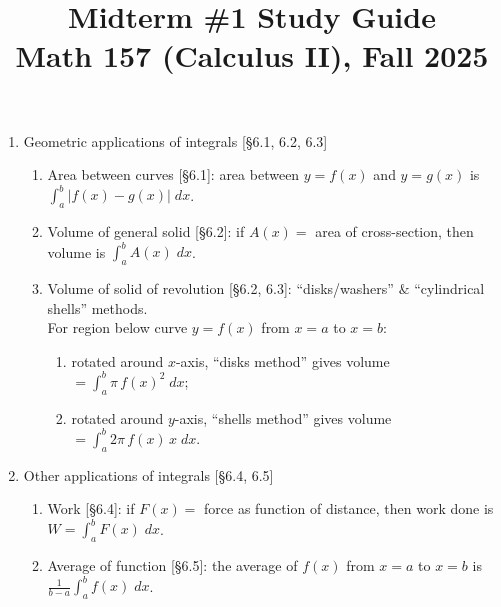 \documentclass[11pt]{article}
\title{Midterm \#1 Study Guide \\ Math 157 (Calculus II), Fall 2025}
\date{}
\begin{document}
\maketitle

\thispagestyle{empty}

\vspace{-2cm}

\begin{enumerate}
\item Geometric applications of integrals [\S6.1, 6.2, 6.3]
\begin{enumerate}
\item Area between curves [\S6.1]: area between $y=f(x)$ and $y=g(x)$ is $\int_{a}^{b} |f(x)-g(x)| \; dx$.
\item Volume of general solid [\S6.2]: if $A(x)=$ area of cross-section, then volume is $\int_a^b A(x) \;dx$.
\item Volume of solid of revolution [\S6.2, 6.3]: ``disks/washers'' $\&$ ``cylindrical shells'' methods.  \\For region below curve $y=f(x)$ from $x=a$ to $x=b$:
\begin{enumerate}
\item rotated around $x$-axis, ``disks method'' gives volume $=\int_a^b \pi \, f(x)^2 \; dx$;
\item rotated around $y$-axis, ``shells method'' gives volume $=\int_a^b 2 \pi \, f(x) \, x \; dx$.
\end{enumerate}
\end{enumerate}

\item Other applications of integrals [\S6.4, 6.5]
\begin{enumerate}
\item Work [\S6.4]: if $F(x)=$ force as function of distance, then work done is $W=\int_{a}^{b} F(x) \; dx$.
\item Average of function [\S6.5]: the average of $f(x)$ from $x=a$ to $x=b$ is $\frac{1}{b-a}\int_a^b f(x) \; dx$.
\end{enumerate}


\end{enumerate}
\end{document}
